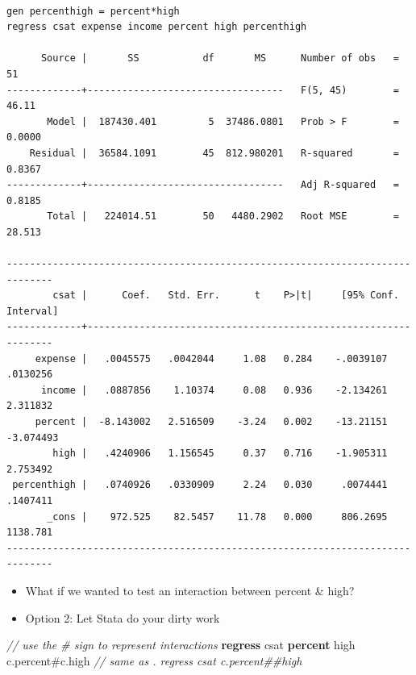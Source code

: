 \documentclass[
]{book}
\newenvironment{Shaded}{\begin{snugshade}}{\end{snugshade}}
\newcommand{\CommentTok}[1]{\textcolor[rgb]{0.56,0.35,0.01}{\textit{#1}}}
\newcommand{\KeywordTok}[1]{\textcolor[rgb]{0.13,0.29,0.53}{\textbf{#1}}}
\newcommand{\NormalTok}[1]{#1}
\providecommand{\tightlist}{%
  \setlength{\itemsep}{0pt}\setlength{\parskip}{0pt}}
\begin{document}
\begin{verbatim}

gen percenthigh = percent*high
regress csat expense income percent high percenthigh

      Source |       SS           df       MS      Number of obs   =        51
-------------+----------------------------------   F(5, 45)        =     46.11
       Model |  187430.401         5  37486.0801   Prob > F        =    0.0000
    Residual |  36584.1091        45  812.980201   R-squared       =    0.8367
-------------+----------------------------------   Adj R-squared   =    0.8185
       Total |   224014.51        50   4480.2902   Root MSE        =    28.513

------------------------------------------------------------------------------
        csat |      Coef.   Std. Err.      t    P>|t|     [95% Conf. Interval]
-------------+----------------------------------------------------------------
     expense |   .0045575   .0042044     1.08   0.284    -.0039107    .0130256
      income |   .0887856    1.10374     0.08   0.936    -2.134261    2.311832
     percent |  -8.143002   2.516509    -3.24   0.002    -13.21151   -3.074493
        high |   .4240906   1.156545     0.37   0.716    -1.905311    2.753492
 percenthigh |   .0740926   .0330909     2.24   0.030     .0074441    .1407411
       _cons |    972.525    82.5457    11.78   0.000     806.2695    1138.781
------------------------------------------------------------------------------
\end{verbatim}

\begin{itemize}
\tightlist
\item
  What if we wanted to test an interaction between percent \& high?
\item
  Option 2: Let Stata do your dirty work
\end{itemize}

\begin{Shaded}
\begin{Highlighting}[]
  \CommentTok{// use the # sign to represent interactions }
  \KeywordTok{regress}\NormalTok{ csat }\KeywordTok{percent}\NormalTok{ high c.percent#c.high}
  \CommentTok{// same as . regress csat c.percent##high}
\end{Highlighting}
\end{Shaded}
\end{document}
